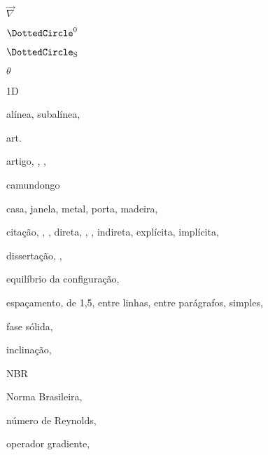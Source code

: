 
\begin{RemissiveIndex}
\item \ensuremath{\vec{\nabla}} 
\item \ensuremath{\DottedCircle^0} 
\item \ensuremath{\DottedCircle_\mathrm{S}} 
\item \ensuremath{\theta} 
\item 1D 
\indexspace%
\item alínea, 
\subitem subalínea, 
\item art.\ 
\item artigo, , , 
\indexspace%
\item camundongo 
\item casa, 
\subitem janela, 
\subsubitem metal, 
\subitem porta, 
\subsubitem madeira, 
\item citação, , , 
\subitem direta, , , 
\subitem indireta, 
\subsubitem explícita, 
\subsubitem implícita, 
\indexspace%
\item dissertação, , 
\indexspace%
\item equilíbrio da configuração, 
\item espaçamento, 
\subitem de 1,5, 
\subitem entre linhas, 
\subitem entre parágrafos, 
\subitem simples, 
\indexspace%
\item fase sólida, 
\indexspace%
\item inclinação, 
\indexspace%
\item NBR 
\item Norma Brasileira, 
\item número de Reynolds, 
\indexspace%
\item operador gradiente, 

\end{RemissiveIndex}
